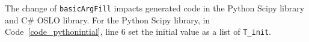 






The change of \verb|basicArgFill| impacts generated code in the Python Scipy library and C\# OSLO library. For the Python Scipy library, in Code~\ref{code_pythonintial}, line 6 set the initial value as a list of \verb|T_init|.

